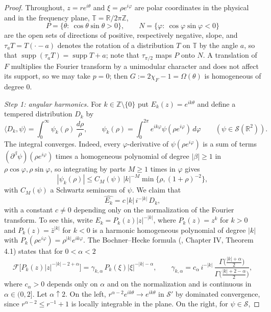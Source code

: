 \documentclass{article}
\newcommand{\tmop}[1]{\ensuremath{\operatorname{#1}}}
\def\R{{\mathbb R}}
\def\Z{{\mathbb Z}}
\def\T{{\mathbb T}}
\begin{document}
	\begin{proof}
		Throughout, $z=re^{i\theta}$ and $\xi=\rho e^{i\varphi}$ are polar coordinates in the physical and in the frequency plane, $\T=\R/2\pi\Z$,
		$$P=\{\theta:\ \cos\theta\sin\theta>0\},\qquad N=\{\varphi:\ \cos\varphi\sin\varphi<0\}$$
		are the open sets of directions of positive, respectively negative, slope, and $\tau_aT=T(\cdot-a)$ denotes the rotation of a distribution $T$ on $\T$ by the angle $a$, so that $\tmop{supp}(\tau_aT)=\tmop{supp}T+a$; note that $\tau_{\pi/2}$ maps $P$ onto $N$. A translation of $F$ multiplies the Fourier transform by a unimodular character and does not affect its support, so we may take $p=0$; then $G:=2\chi_F-1=\Omega(\theta)$ is homogeneous of degree $0$.

		\emph{Step 1: angular harmonics.} For $k\in\Z\setminus\{0\}$ put $E_k(z)=e^{ik\theta}$ and define a tempered distribution $D_k$ by
		$$\langle D_k,\psi\rangle=\int_0^\infty\psi_k(\rho)\,\frac{d\rho}{\rho},\qquad \psi_k(\rho)=\int_0^{2\pi}e^{ik\varphi}\psi(\rho e^{i\varphi})\,d\varphi\qquad(\psi\in\mathcal S(\R^2)).$$
		The integral converges. Indeed, every $\varphi$-derivative of $\psi(\rho e^{i\varphi})$ is a sum of terms $(\partial^\beta\psi)(\rho e^{i\varphi})$ times a homogeneous polynomial of degree $|\beta|\geq1$ in $\rho\cos\varphi,\rho\sin\varphi$, so integrating by parts $M\geq1$ times in $\varphi$ gives
		\begin{equation}\label{psik}
			|\psi_k(\rho)|\leq C_M(\psi)\,|k|^{-M}\min\{\rho,(1+\rho)^{-2}\},
		\end{equation}
		with $C_M(\psi)$ a Schwartz seminorm of $\psi$. We claim that
		\begin{equation}\label{BH}
			\widehat{E_k}=c\,|k|\,i^{-|k|}\,D_k ,
		\end{equation}
		with a constant $c\neq0$ depending only on the normalization of the Fourier transform. To see this, write $E_k=P_k(z)|z|^{-|k|}$, where $P_k(z)=z^k$ for $k>0$ and $P_k(z)=\bar z^{|k|}$ for $k<0$ is a harmonic homogeneous polynomial of degree $|k|$ with $P_k(\rho e^{i\varphi})=\rho^{|k|}e^{ik\varphi}$. The Bochner--Hecke formula (\cite{SW2}, Chapter IV, Theorem 4.1) states that for $0<\alpha<2$
		$$\mathcal F\big[P_k(z)|z|^{-|k|-2+\alpha}\big]=\gamma_{k,\alpha}\,P_k(\xi)|\xi|^{-|k|-\alpha},\qquad\gamma_{k,\alpha}=c_\alpha\, i^{-|k|}\,\frac{\Gamma\big(\frac{|k|+\alpha}2\big)}{\Gamma\big(\frac{|k|+2-\alpha}2\big)},$$
		where $c_\alpha>0$ depends only on $\alpha$ and on the normalization and is continuous in $\alpha\in(0,2]$. Let $\alpha\uparrow2$. On the left, $r^{\alpha-2}e^{ik\theta}\to e^{ik\theta}$ in $\mathcal S'$ by dominated convergence, since $r^{\alpha-2}\leq r^{-1}+1$ is locally integrable in the plane. On the right, for $\psi\in\mathcal S$,

\end{proof}
\end{document}
